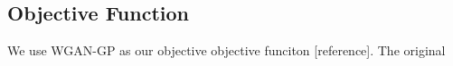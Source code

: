 \subsection{Objective Function}
We use WGAN-GP as our objective objective funciton [reference]. The original 